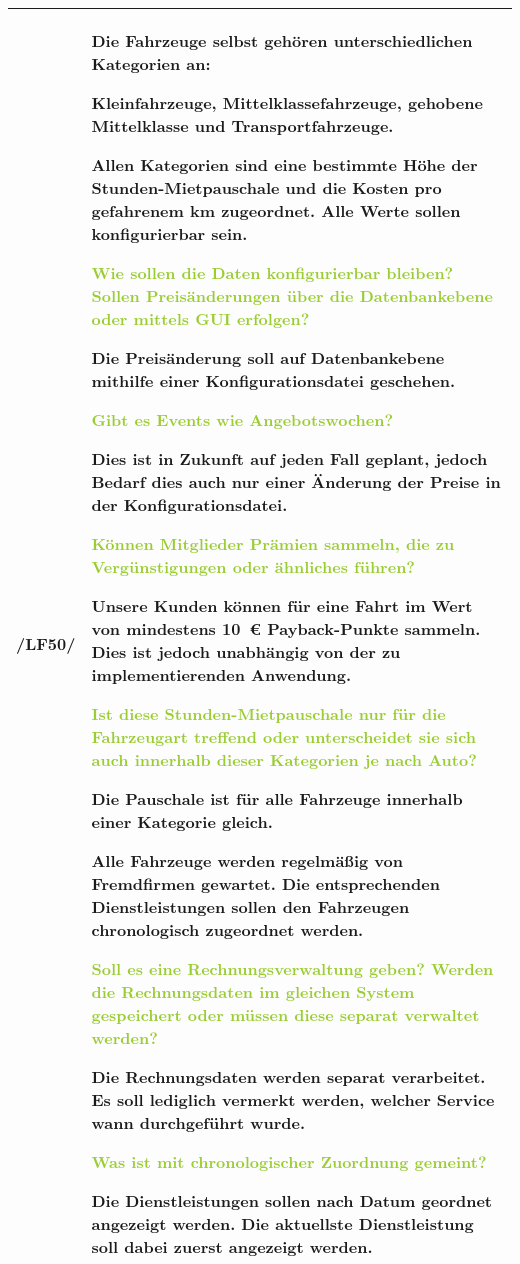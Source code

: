 \begin{tabular}[ht] {l | p{13cm}}
    \hline
    /LF50/ & Die Fahrzeuge selbst gehören unterschiedlichen Kategorien an: 

    Kleinfahrzeuge, Mittelklassefahrzeuge, gehobene Mittelklasse und Transportfahrzeuge.  

    Allen Kategorien sind eine bestimmte Höhe der Stunden-Mietpauschale und die Kosten pro gefahrenem km zugeordnet. Alle Werte sollen konfigurierbar sein. 

    \textcolor{YellowGreen}{Wie sollen die Daten konfigurierbar bleiben? Sollen Preisänderungen über die Datenbankebene oder mittels GUI erfolgen?}

    \textcolor{NavyBlue}{Die Preisänderung soll auf Datenbankebene mithilfe einer Konfigurationsdatei geschehen.}

    \textcolor{YellowGreen}{Gibt es Events wie Angebotswochen?}

    \textcolor{NavyBlue}{Dies ist in Zukunft auf jeden Fall geplant, jedoch Bedarf dies auch nur einer Änderung der Preise in der Konfigurationsdatei.}

    \textcolor{YellowGreen}{Können Mitglieder Prämien sammeln, die zu Vergünstigungen oder ähnliches führen?}

    \textcolor{NavyBlue}{Unsere Kunden können für eine Fahrt im Wert von mindestens 10 € Payback-Punkte sammeln. Dies ist jedoch unabhängig von der zu implementierenden Anwendung.}

    \textcolor{YellowGreen}{Ist diese Stunden-Mietpauschale nur für die Fahrzeugart treffend oder unterscheidet sie sich auch innerhalb dieser Kategorien je nach Auto?}

    \textcolor{NavyBlue}{Die Pauschale ist für alle Fahrzeuge innerhalb einer Kategorie gleich.}

    Alle Fahrzeuge werden regelmäßig von Fremdfirmen gewartet. Die entsprechenden Dienstleistungen sollen den Fahrzeugen chronologisch zugeordnet werden. 
    
    \textcolor{YellowGreen}{Soll es eine Rechnungsverwaltung geben? Werden die Rechnungsdaten im gleichen System gespeichert oder müssen diese separat verwaltet werden?}

    \textcolor{NavyBlue}{Die Rechnungsdaten werden separat verarbeitet. Es soll lediglich vermerkt werden, welcher Service wann durchgeführt wurde.}

    \textcolor{YellowGreen}{Was ist mit chronologischer Zuordnung gemeint?}

    \textcolor{NavyBlue}{Die Dienstleistungen sollen nach Datum geordnet angezeigt werden. Die aktuellste Dienstleistung soll dabei zuerst angezeigt werden.}
    \\
    \hline
\end{tabular}

